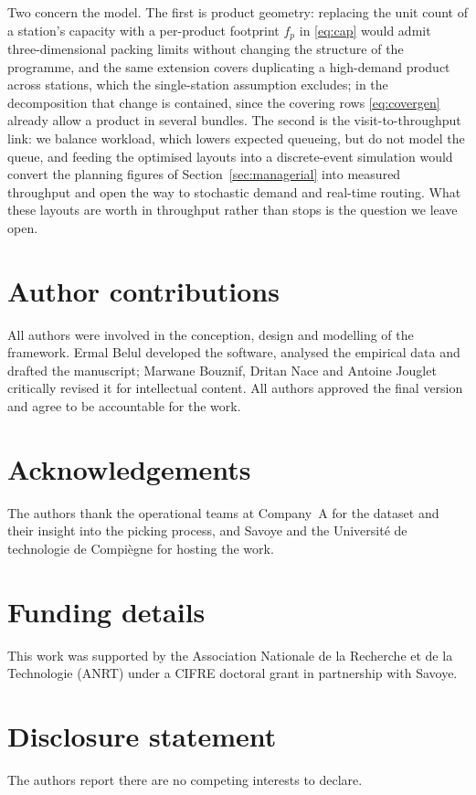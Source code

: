 \documentclass[]{interact}
\begin{document}
Two concern the model. The first is product geometry: replacing the unit count of a station's capacity with a per-product footprint $f_p$ in \eqref{eq:cap} would admit three-dimensional packing limits without changing the structure of the programme, and the same extension covers duplicating a high-demand product across stations, which the single-station assumption excludes; in the decomposition that change is contained, since the covering rows \eqref{eq:covergen} already allow a product in several bundles. The second is the visit-to-throughput link: we balance workload, which lowers expected queueing, but do not model the queue, and feeding the optimised layouts into a discrete-event simulation would convert the planning figures of Section~\ref{sec:managerial} into measured throughput and open the way to stochastic demand and real-time routing. What these layouts are worth in throughput rather than stops is the question we leave open.

\section*{Author contributions}
All authors were involved in the conception, design and modelling of the framework. Ermal Belul developed the software, analysed the empirical data and drafted the manuscript; Marwane Bouznif, Dritan Nace and Antoine Jouglet critically revised it for intellectual content. All authors approved the final version and agree to be accountable for the work.

\section*{Acknowledgements}
The authors thank the operational teams at Company~A for the dataset and their insight into the picking process, and Savoye and the Universit\'{e} de technologie de Compi\`{e}gne for hosting the work.

\section*{Funding details}
This work was supported by the Association Nationale de la Recherche et de la Technologie (ANRT) under a CIFRE doctoral grant in partnership with Savoye.

\section*{Disclosure statement}
The authors report there are no competing interests to declare.
\end{document}
